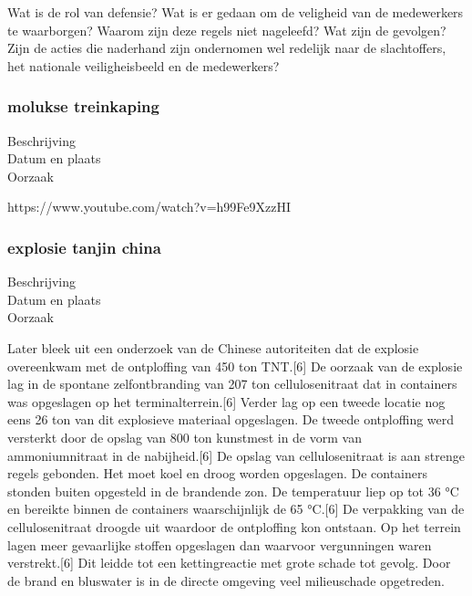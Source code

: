 {{{{{{{{{{{Wat is de rol van defensie?
Wat is er gedaan om de veligheid van de medewerkers te waarborgen?
Waarom zijn deze regels niet nageleefd?
Wat zijn de gevolgen?
Zijn de acties die naderhand zijn ondernomen wel redelijk naar de slachtoffers, het nationale veiligheisbeeld en de medewerkers?



\subsubsection{molukse treinkaping }

	\begin{description}
	\item[Beschrijving]
	\item[Datum en plaats] 
	\item[Oorzaak]
\end{description}
https://www.youtube.com/watch?v=h99Fe9XzzHI 
\cite{molukseTreinkaping}
\subsubsection{explosie tanjin china }

	\begin{description}
	\item[Beschrijving]
	\item[Datum en plaats] 
	\item[Oorzaak]
\end{description}

Later bleek uit een onderzoek van de Chinese autoriteiten dat de explosie overeenkwam met de ontploffing van 450 ton TNT.[6] 
De oorzaak van de explosie lag in de spontane zelfontbranding van 207 ton cellulosenitraat dat in containers was opgeslagen op het terminalterrein.[6] 
Verder lag op een tweede locatie nog eens 26 ton van dit explosieve materiaal opgeslagen.
De tweede ontploffing werd versterkt door de opslag van 800 ton kunstmest in de vorm van ammoniumnitraat in de nabijheid.[6]
De opslag van cellulosenitraat is aan strenge regels gebonden. Het moet koel en droog worden opgeslagen. De containers stonden buiten opgesteld in de brandende zon. De temperatuur liep op tot 36 °C en bereikte binnen de containers waarschijnlijk de 65 °C.[6] De verpakking van de cellulosenitraat droogde uit waardoor de ontploffing kon ontstaan. Op het terrein lagen meer gevaarlijke stoffen opgeslagen dan waarvoor vergunningen waren verstrekt.[6] Dit leidde tot een kettingreactie met grote schade tot gevolg. Door de brand en bluswater is in de directe omgeving veel milieuschade opgetreden.


}}}}}}}}}}}
